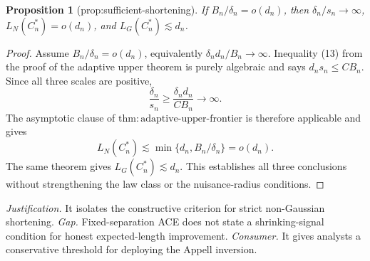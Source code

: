 \documentclass{article}
\newtheorem{proposition}{Proposition}
\begin{document}
\begin{proposition}[prop:sufficient-shortening]\label{prop:sufficient-shortening}
If \(B_n/\delta_n=o(d_n)\), then \(\delta_n/s_n\to\infty\), \(L_N(C_n^*)=o(d_n)\), and \(L_G(C_n^*)\lesssim d_n\).
\end{proposition}
\begin{proof}
Assume \(B_n/\delta_n=o(d_n)\), equivalently \(\delta_nd_n/B_n\to\infty\).  Inequality (13) from the proof of the adaptive upper theorem is purely algebraic and says \(d_ns_n\le CB_n\).  Since all three scales are positive,
\[
\frac{\delta_n}{s_n}
\ge\frac{\delta_nd_n}{CB_n}\longrightarrow\infty.
\]
The asymptotic clause of \(\mathrm{thm:adaptive\mbox{-}upper\mbox{-}frontier}\) is therefore applicable and gives
\[
L_N(C_n^*)\lesssim\min\{d_n,B_n/\delta_n\}=o(d_n).
\]
The same theorem gives \(L_G(C_n^*)\lesssim d_n\).  This establishes all three conclusions without strengthening the law class or the nuisance-radius conditions.
\end{proof}
\par\smallskip\noindent \textit{Justification.} It isolates the constructive criterion for strict non-Gaussian shortening. \textit{Gap.} Fixed-separation ACE does not state a shrinking-signal condition for honest expected-length improvement. \textit{Consumer.} It gives analysts a conservative threshold for deploying the Appell inversion.
\end{document}
